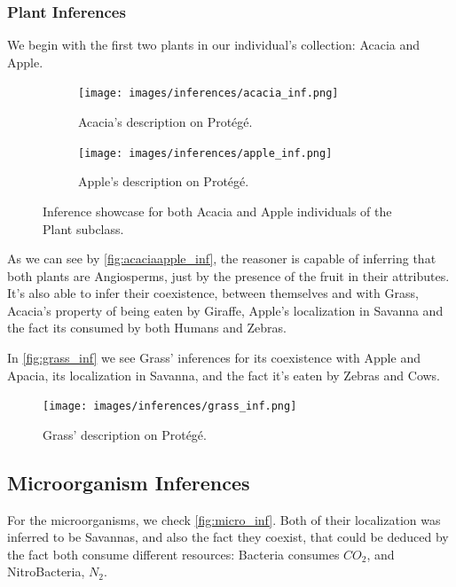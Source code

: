 \newpage


\subsubsection{Plant Inferences}

We begin with the first two plants in our individual's collection: Acacia and Apple.

\begin{figure}[h!]
    \centering
    \begin{subfigure}[b]{0.8\linewidth}
      \texttt{[image: images/inferences/acacia\_inf.png]}
      \caption{Acacia's description on Protégé.}
    \end{subfigure}
    \begin{subfigure}[b]{0.8\linewidth}
      \texttt{[image: images/inferences/apple\_inf.png]}
      \caption{Apple's description on Protégé.}
    \end{subfigure}
    \caption{Inference showcase for both Acacia and Apple individuals of the Plant subclass.}
    \label{fig:acaciaapple_inf}
\end{figure}

  As we can see by \autoref{fig:acaciaapple_inf}, the reasoner is capable of inferring that both plants are Angiosperms, just by the presence of the fruit in their attributes. It's also able to infer their coexistence, between themselves and with Grass, Acacia's property of being eaten by Giraffe, Apple's localization in Savanna and the fact its consumed by both Humans and Zebras.

  In \autoref{fig:grass_inf} we see Grass' inferences for its coexistence with Apple and Apacia, its localization in Savanna, and the fact it's eaten by Zebras and Cows.

  \begin{figure}[h!]
    \centering
    \texttt{[image: images/inferences/grass\_inf.png]}
    \caption{Grass' description on Protégé.}
    \label{fig:grass_inf}
  \end{figure}

  \newpage
  \subsection{Microorganism Inferences}
  For the microorganisms, we check \autoref{fig:micro_inf}. Both of their localization was inferred to be Savannas, and also the fact they coexist, that could be deduced by the fact both consume different resources: Bacteria consumes $CO_{2}$, and NitroBacteria, $N_{2}$.

